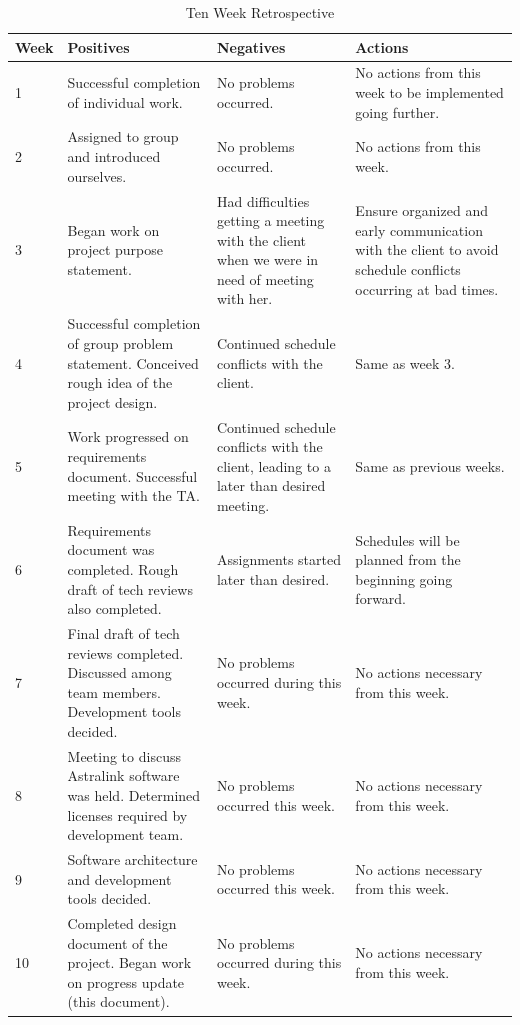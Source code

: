 \documentclass[onecolumn, draftclsnofoot,10pt, compsoc]{IEEEtran}
\begin{document}
\begin{table}[ht]
    \centering
    \begin{tabular}{p{1cm}|p{4.5cm}|p{4.5cm}|p{4.5cm}}
        \textbf{Week} & \textbf{Positives} & \textbf{Negatives} & \textbf{Actions} \\
        \hline \hline
        1 & Successful completion of individual work. & No problems occurred. & No actions from this week to be implemented going further. \\
        \hline
        2 & Assigned to group and introduced ourselves. & No problems occurred. & No actions from this week. \\
        \hline
        3 & Began work on project purpose statement. & Had difficulties getting a meeting with the client when we were in need of meeting with her. & Ensure organized and early communication with the client to avoid schedule conflicts occurring at bad times. \\
        \hline
        4 & Successful completion of group problem statement. Conceived rough idea of the project design. & Continued schedule conflicts with the client. & Same as week 3. \\
        \hline
        5 & Work progressed on requirements document. Successful meeting with the TA. & Continued schedule conflicts with the client, leading to a later than desired meeting. & Same as previous weeks. \\
        \hline
        6 & Requirements document was completed. Rough draft of tech reviews also completed. & Assignments started later than desired. & Schedules will be planned from the beginning going forward. \\
        \hline
        7 & Final draft of tech reviews completed. Discussed among team members. Development tools decided. & No problems occurred during this week. & No actions necessary from this week. \\
        \hline
        8 & Meeting to discuss Astralink software was held. Determined licenses required by development team. & No problems occurred this week. & No actions necessary from this week. \\
        \hline
        9 & Software architecture and development tools decided. & No problems occurred this week. & No actions necessary from this week. \\
        \hline
        10 & Completed design document of the project. Began work on progress update (this document). & No problems occurred during this week. & No actions necessary from this week. \\
    \end{tabular}
    \caption{Ten Week Retrospective}
    \label{tab:tab1}
\end{table}
\end{document}
